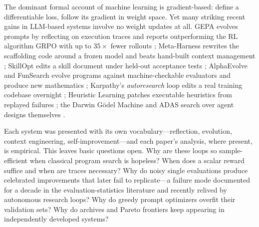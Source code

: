 \documentclass{article}
\theoremstyle{plain}
\theoremstyle{definition}
\theoremstyle{remark}
\begin{document}
The dominant formal account of machine learning is gradient-based: define a differentiable loss, follow its gradient in weight space. Yet many striking recent gains in LLM-based systems involve no weight updates at all. GEPA evolves prompts by reflecting on execution traces and reports outperforming the RL algorithm GRPO with up to $35\times$ fewer rollouts \citep{agrawal2025gepa}; Meta-Harness rewrites the scaffolding code around a frozen model and beats hand-built context management \citep{lee2026metaharness}; SkillOpt edits a skill document under held-out acceptance tests \citep{yang2026skillopt}; AlphaEvolve and FunSearch evolve programs against machine-checkable evaluators and produce new mathematics \citep{novikov2025alphaevolve,romeraparedes2024funsearch}; Karpathy's \emph{autoresearch} loop edits a real training codebase overnight \citep{karpathy2026autoresearch}; Heuristic Learning patches executable heuristics from replayed failures \citep{weng2026hl}; the Darwin G\"odel Machine and ADAS search over agent designs themselves \citep{zhang2025dgm,hu2025adas}.

Each system was presented with its own vocabulary---reflection, evolution, context engineering, self-improvement---and each paper's analysis, where present, is empirical. This leaves basic questions open. Why are these loops so sample-efficient when classical program search is hopeless? When does a scalar reward suffice and when are traces necessary? Why do noisy single evaluations produce celebrated improvements that later fail to replicate---a failure mode documented for a decade in the evaluation-statistics literature \citep{henderson2018matters,dodge2019show,agarwal2021precipice} and recently relived by autonomous research loops? Why do greedy prompt optimizers overfit their validation sets? Why do archives and Pareto frontiers keep appearing in independently developed systems?
\end{document}
